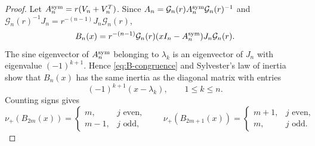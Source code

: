 \documentclass[review,hidelinks,onefignum,onetabnum]{siamart251216}
\begin{document}
\begin{proof}
Let \(A_n^{\rm sym}=r(V_n+V_n^T)\).  Since
\(A_n=\mathcal G_n(r)A_n^{\rm sym}\mathcal G_n(r)^{-1}\) and
\(\mathcal G_n(r)^{-1}J_n
=r^{-(n-1)}J_n\mathcal G_n(r)\),
\begin{equation}\label{eq:B-congruence}
 B_n(x)=r^{-(n-1)}\mathcal G_n(r)(xI_n-A_n^{\rm sym})
 J_n\mathcal G_n(r).
\end{equation}
The sine eigenvector of \(A_n^{\rm sym}\) belonging to \(\lambda_k\) is an
eigenvector of \(J_n\) with eigenvalue \((-1)^{k+1}\).  Hence
\eqref{eq:B-congruence} and Sylvester's law of inertia show that
\(B_n(x)\) has the same inertia as the diagonal matrix with entries
\[
 (-1)^{k+1}(x-\lambda_k),\qquad 1\leq k\leq n.
\]
Counting signs gives
\begin{equation}\label{eq:middle-inertia}
 \nu_+(B_{2m}(x))=
 \begin{cases}m,&j\text{ even},\\m-1,&j\text{ odd},\end{cases}
 \qquad
 \nu_+(B_{2m+1}(x))=
 \begin{cases}m+1,&j\text{ even},\\m,&j\text{ odd}.
 \end{cases}
\end{equation}


\end{proof}
\end{document}
